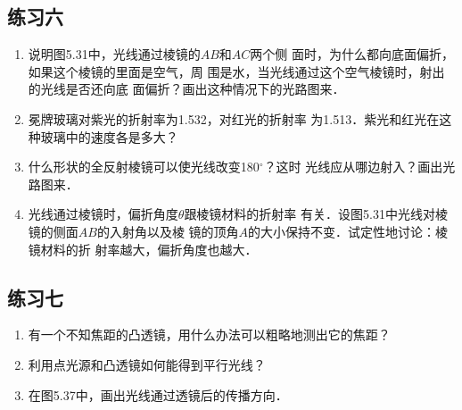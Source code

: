 \subsection{练习六}
\begin{enumerate}
    \item 说明图5.31中，光线通过棱镜的$AB$和$AC$两个侧
面时，为什么都向底面偏折，如果这个棱镜的里面是空气，周
围是水，当光线通过这个空气棱镜时，射出的光线是否还向底
面偏折？画出这种情况下的光路图来．

\begin{solution}

\end{solution}
\item 冕牌玻璃对紫光的折射率为1.532，对红光的折射率
为1.513．紫光和红光在这种玻璃中的速度各是多大？

\begin{solution}

\end{solution}
\item 什么形状的全反射棱镜可以使光线改变180$^\circ$？这时
光线应从哪边射入？画出光路图来．

\begin{solution}

\end{solution}
\item 光线通过棱镜时，偏折角度$\theta$跟棱镜材料的折射率
有关．设图5.31中光线对棱镜的侧面$AB$的入射角以及棱
镜的顶角$A$的大小保持不变．试定性地讨论：棱镜材料的折
射率越大，偏折角度也越大．

\begin{solution}

\end{solution}
\end{enumerate}


\subsection{练习七}
\begin{enumerate}
    \item 有一个不知焦距的凸透镜，用什么办法可以粗略地测出它的焦距？

    \begin{solution}

    \end{solution}
    \item 利用点光源和凸透镜如何能得到平行光线？

    \begin{solution}

    \end{solution}
    \item 在图5.37中，画出光线通过透镜后的传播方向．

    \begin{solution}

    \end{solution}
\end{enumerate}

